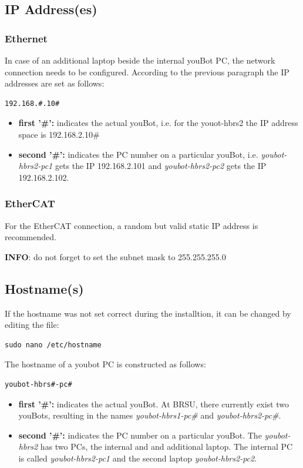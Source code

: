 \documentclass[a4paper,12pt]{article}
\begin{document}
\subsection{IP Address(es)}

\subsubsection{Ethernet}
In case of an additional laptop beside the internal youBot PC, the network connection needs to be configured. According to the previous paragraph the IP addresses are set as follows:
\begin{lstlisting}
192.168.#.10#
\end{lstlisting}

\begin{itemize}
	\item \textbf{first '\#':} indicates the actual youBot, i.e. for the youot-hbrs2 the IP address space is 192.168.2.10\#
	\item \textbf{second '\#':} indicates the PC number on a particular youBot, i.e. \textit{youbot-hbrs2-pc1} gets the IP 192.168.2.101 and \textit{youbot-hbrs2-pc2} gets the IP 192.168.2.102.
\end{itemize}

\subsubsection{EtherCAT}
For the EtherCAT connection, a random but valid static IP address is recommended. 

\textbf{INFO}: do not forget to set the subnet mask to 255.255.255.0

\subsection{Hostname(s)}
If the hostname was not set correct during the installtion, it can be changed by editing the file:
\begin{lstlisting}
sudo nano /etc/hostname
\end{lstlisting}

The hostname of a youbot PC is constructed as follows:
\begin{lstlisting}
youbot-hbrs#-pc#
\end{lstlisting}

\begin{itemize}
	\item \textbf{first '\#':} indicates the actual youBot. At BRSU, there currently exist two youBots, resulting in the names \textit{youbot-hbrs1-pc\#} and \textit{youbot-hbrs2-pc\#}.
	\item \textbf{second '\#':} indicates the PC number on a particular youBot. The \textit{youbot-hbrs2} has two PCs, the internal and and additional laptop. The internal PC is called \textit{youbot-hbrs2-pc1} and the second laptop \textit{youbot-hbrs2-pc2}.
\end{itemize}
\end{document}
